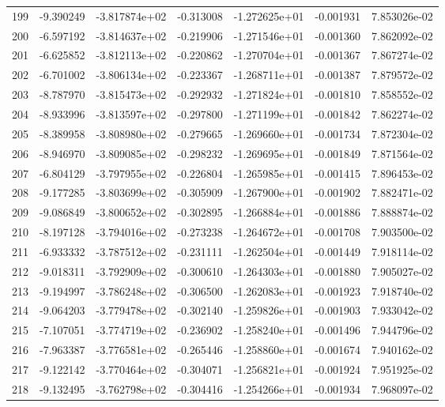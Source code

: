 \begin{tabular}{rrrrrrr}
 199 &  -9.390249 & -3.817874e+02 & -0.313008 & -1.272625e+01 &  -0.001931 &  7.853026e-02 \\
 200 &  -6.597192 & -3.814637e+02 & -0.219906 & -1.271546e+01 &  -0.001360 &  7.862092e-02 \\
 201 &  -6.625852 & -3.812113e+02 & -0.220862 & -1.270704e+01 &  -0.001367 &  7.867274e-02 \\
 202 &  -6.701002 & -3.806134e+02 & -0.223367 & -1.268711e+01 &  -0.001387 &  7.879572e-02 \\
 203 &  -8.787970 & -3.815473e+02 & -0.292932 & -1.271824e+01 &  -0.001810 &  7.858552e-02 \\
 204 &  -8.933996 & -3.813597e+02 & -0.297800 & -1.271199e+01 &  -0.001842 &  7.862274e-02 \\
 205 &  -8.389958 & -3.808980e+02 & -0.279665 & -1.269660e+01 &  -0.001734 &  7.872304e-02 \\
 206 &  -8.946970 & -3.809085e+02 & -0.298232 & -1.269695e+01 &  -0.001849 &  7.871564e-02 \\
 207 &  -6.804129 & -3.797955e+02 & -0.226804 & -1.265985e+01 &  -0.001415 &  7.896453e-02 \\
 208 &  -9.177285 & -3.803699e+02 & -0.305909 & -1.267900e+01 &  -0.001902 &  7.882471e-02 \\
 209 &  -9.086849 & -3.800652e+02 & -0.302895 & -1.266884e+01 &  -0.001886 &  7.888874e-02 \\
 210 &  -8.197128 & -3.794016e+02 & -0.273238 & -1.264672e+01 &  -0.001708 &  7.903500e-02 \\
 211 &  -6.933332 & -3.787512e+02 & -0.231111 & -1.262504e+01 &  -0.001449 &  7.918114e-02 \\
 212 &  -9.018311 & -3.792909e+02 & -0.300610 & -1.264303e+01 &  -0.001880 &  7.905027e-02 \\
 213 &  -9.194997 & -3.786248e+02 & -0.306500 & -1.262083e+01 &  -0.001923 &  7.918740e-02 \\
 214 &  -9.064203 & -3.779478e+02 & -0.302140 & -1.259826e+01 &  -0.001903 &  7.933042e-02 \\
 215 &  -7.107051 & -3.774719e+02 & -0.236902 & -1.258240e+01 &  -0.001496 &  7.944796e-02 \\
 216 &  -7.963387 & -3.776581e+02 & -0.265446 & -1.258860e+01 &  -0.001674 &  7.940162e-02 \\
 217 &  -9.122142 & -3.770464e+02 & -0.304071 & -1.256821e+01 &  -0.001924 &  7.951925e-02 \\
 218 &  -9.132495 & -3.762798e+02 & -0.304416 & -1.254266e+01 &  -0.001934 &  7.968097e-02 \\

\end{tabular}
